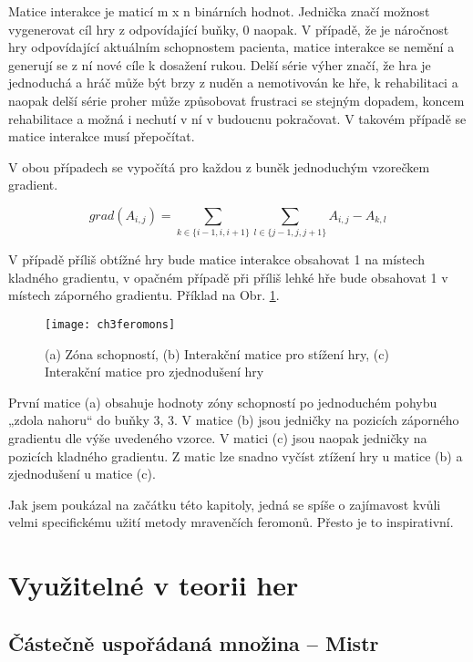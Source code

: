 Matice interakce je maticí m x n binárních hodnot. Jednička značí možnost vygenerovat cíl hry z odpovídající buňky, 0 naopak. V případě, že je náročnost hry odpovídající aktuálním schopnostem pacienta, matice interakce se nemění a generují se z ní nové cíle k dosažení rukou. Delší série výher značí, že hra je jednoduchá a hráč může být brzy z nuděn a nemotivován ke hře, k rehabilitaci a naopak delší série proher může způsobovat frustraci se stejným dopadem, koncem rehabilitace a možná i nechutí v ní v budoucnu pokračovat. V takovém případě se matice interakce musí přepočítat.

V obou případech se vypočítá pro každou z buněk jednoduchým vzorečkem gradient.

\begin{equation}
	grad(A_{i,j}) = \sum_{k \in \{i-1, i, i+1\}} \sum_{l \in \{j-1, j, j+1\}} A_{i, j} - A_{k, l}
\end{equation}

V případě příliš obtížné hry bude matice interakce obsahovat 1 na místech kladného gradientu, v opačném případě při příliš lehké hře bude obsahovat 1 v místech záporného gradientu. Příklad na Obr. \ref{fig-ch3feromons}.

\begin{figure}
  \centering
  \texttt{[image: ch3feromons]}
	\caption{(a) Zóna schopností, (b) Interakční matice pro stížení hry, (c) Interakční matice pro zjednodušení hry \cite{26poststroke} }
	\label{fig-ch3feromons}
\end{figure}

První matice (a) obsahuje hodnoty zóny schopností po jednoduchém pohybu „zdola nahoru“ do buňky 3, 3. V matice (b) jsou jedničky na pozicích záporného gradientu dle výše uvedeného vzorce. V matici (c) jsou naopak jedničky na pozicích kladného gradientu. Z matic lze snadno vyčíst ztížení hry u matice (b) a zjednodušení u matice (c).

Jak jsem poukázal na začátku této kapitoly, jedná se spíše o zajímavost kvůli velmi specifickému užití metody mravenčích feromonů. Přesto je to inspirativní.


\section{Využitelné v teorii her}

\subsection{Částečně uspořádaná množina – Mistr}


